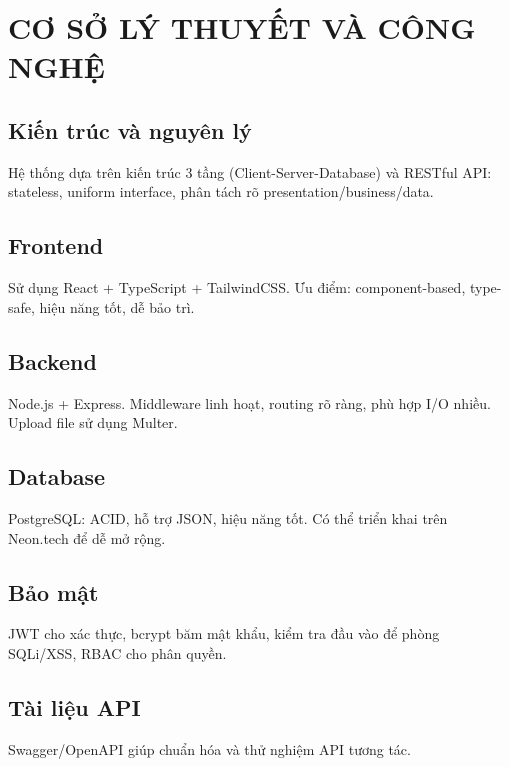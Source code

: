 \chapter{CƠ SỞ LÝ THUYẾT VÀ CÔNG NGHỆ}

\section{Kiến trúc và nguyên lý}
Hệ thống dựa trên kiến trúc 3 tầng (Client-Server-Database) và RESTful API: stateless, uniform interface, phân tách rõ presentation/business/data.

\section{Frontend}
Sử dụng React + TypeScript + TailwindCSS. Ưu điểm: component-based, type-safe, hiệu năng tốt, dễ bảo trì.

\section{Backend}
Node.js + Express. Middleware linh hoạt, routing rõ ràng, phù hợp I/O nhiều. Upload file sử dụng Multer.

\section{Database}
PostgreSQL: ACID, hỗ trợ JSON, hiệu năng tốt. Có thể triển khai trên Neon.tech để dễ mở rộng.

\section{Bảo mật}
JWT cho xác thực, bcrypt băm mật khẩu, kiểm tra đầu vào để phòng SQLi/XSS, RBAC cho phân quyền.

\section{Tài liệu API}
Swagger/OpenAPI giúp chuẩn hóa và thử nghiệm API tương tác.
